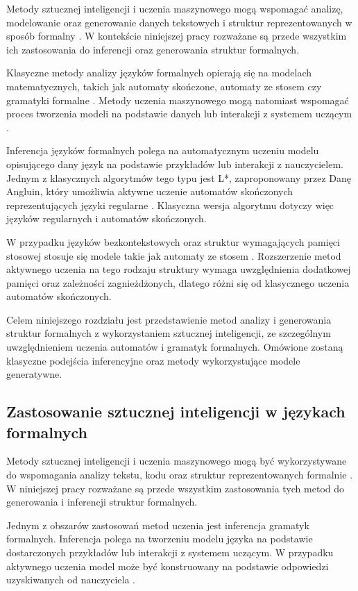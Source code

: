 \documentclass[12pt]{article}
\begin{document}
Metody sztucznej inteligencji i uczenia maszynowego mogą wspomagać analizę, modelowanie oraz generowanie danych tekstowych i struktur reprezentowanych w sposób formalny \cite{zhao2023,jurafsky2026}. W kontekście niniejszej pracy rozważane są przede wszystkim ich zastosowania do inferencji oraz generowania struktur formalnych.

Klasyczne metody analizy języków formalnych opierają się na modelach matematycznych, takich jak automaty skończone, automaty ze stosem czy gramatyki formalne \cite{hopcroft2007,sipser2012}. Metody uczenia maszynowego mogą natomiast wspomagać proces tworzenia modeli na podstawie danych lub interakcji z systemem uczącym \cite{angluin1987,zhao2023}.

Inferencja języków formalnych polega na automatycznym uczeniu modelu opisującego dany język na podstawie przykładów lub interakcji z nauczycielem. Jednym z klasycznych algorytmów tego typu jest L*, zaproponowany przez Danę Angluin, który umożliwia aktywne uczenie automatów skończonych reprezentujących języki regularne \cite{angluin1987}. Klasyczna wersja algorytmu dotyczy więc języków regularnych i automatów skończonych.

W przypadku języków bezkontekstowych oraz struktur wymagających pamięci stosowej stosuje się modele takie jak automaty ze stosem \cite{hopcroft2007,sipser2012}. Rozszerzenie metod aktywnego uczenia na tego rodzaju struktury wymaga uwzględnienia dodatkowej pamięci oraz zależności zagnieżdżonych, dlatego różni się od klasycznego uczenia automatów skończonych.

Celem niniejszego rozdziału jest przedstawienie metod analizy i generowania struktur formalnych z wykorzystaniem sztucznej inteligencji, ze szczególnym uwzględnieniem uczenia automatów i gramatyk formalnych. Omówione zostaną klasyczne podejścia inferencyjne oraz metody wykorzystujące modele generatywne.


\subsection{Zastosowanie sztucznej inteligencji w językach formalnych}

Metody sztucznej inteligencji i uczenia maszynowego mogą być wykorzystywane do wspomagania analizy tekstu, kodu oraz struktur reprezentowanych formalnie \cite{zhao2023,jurafsky2026}. W niniejszej pracy rozważane są przede wszystkim zastosowania tych metod do generowania i inferencji struktur formalnych.

Jednym z obszarów zastosowań metod uczenia jest inferencja gramatyk formalnych. Inferencja polega na tworzeniu modelu języka na podstawie dostarczonych przykładów lub interakcji z systemem uczącym. W przypadku aktywnego uczenia model może być konstruowany na podstawie odpowiedzi uzyskiwanych od nauczyciela \cite{angluin1987}.
\end{document}
